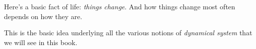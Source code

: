 \documentclass[7Sketches]{subfiles}
\begin{document}
%


\setcounter{chapter}{0}%


\chapter{}


Here's a basic fact of life: \emph{things change}. And how things change most
often depends on how they are.

This is the basic idea underlying all the various notions of \emph{dynamical
  system} that we will see in this book. 
\end{document}
